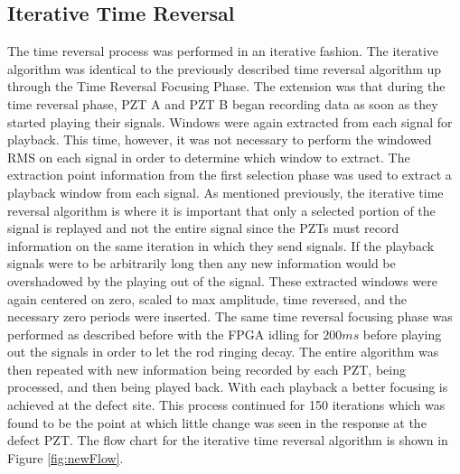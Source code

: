 \subsection{Iterative Time Reversal}
The time reversal process was performed in an iterative fashion. The iterative algorithm was identical to the previously described time reversal algorithm up through the Time Reversal Focusing Phase. The extension was that during the time reversal phase, PZT A and PZT B began recording data as soon as they started playing their signals. Windows were again extracted from each signal for playback. This time, however, it was not necessary to perform the windowed RMS on each signal in order to determine which window to extract. The extraction point information from the first selection phase was used to extract a playback window from each signal. As mentioned previously, the iterative time reversal algorithm is where it is important that only a selected portion of the signal is replayed and not the entire signal since the PZTs must record information on the same iteration in which they send signals. If the playback signals were to be arbitrarily long then any new information would be overshadowed by the playing out of the signal. These extracted windows were again centered on zero, scaled to max amplitude, time reversed, and the necessary zero periods were inserted. The same time reversal focusing phase was performed as described before with the FPGA idling for $200ms$ before playing out the signals in order to let the rod ringing decay. The entire algorithm was then repeated with new information being recorded by each PZT, being processed, and then being played back. With each playback a better focusing is achieved at the defect site. This process continued for 150 iterations which was found to be the point at which little change was seen in the response at the defect PZT. The flow chart for the iterative time reversal algorithm is shown in Figure \ref{fig:newFlow}.

